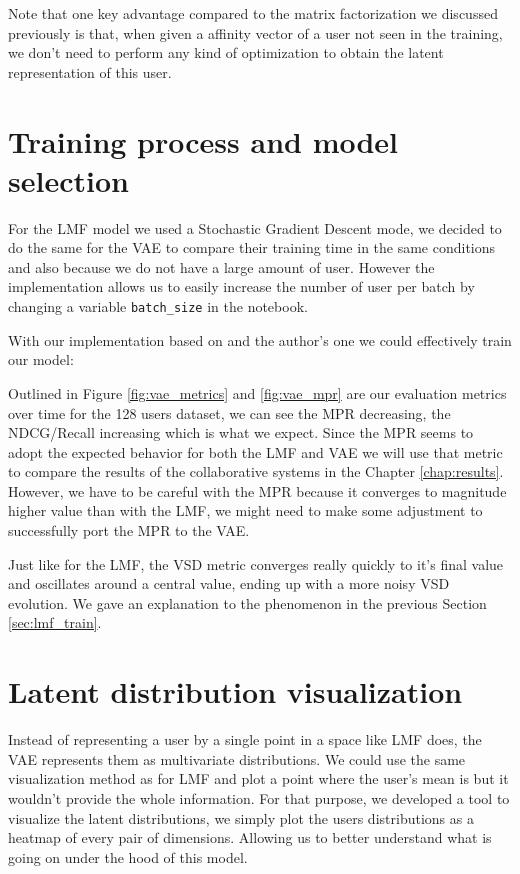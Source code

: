 Note that one key advantage compared to the matrix factorization we discussed previously is that, when given a affinity vector of a user not seen in the training, we don't need to perform any kind of optimization to obtain the latent representation of this user.

\section{Training process and model selection} \label{sec:vae_train}
For the LMF model we used a Stochastic Gradient Descent mode, we decided to do the same for the VAE to compare their training time in the same conditions and also because we do not have a large amount of user. However the implementation allows us to easily increase the number of user per batch by changing a variable \texttt{batch\_size} in the  notebook.

With our implementation based on \cite{vae-cf-pytorch} and the author's one \cite{vae-cf} we could effectively train our model:

Outlined in Figure \ref{fig:vae_metrics} and \ref{fig:vae_mpr} are our evaluation metrics over time for the 128 users dataset, we can see the MPR decreasing, the NDCG/Recall increasing which is what we expect. Since the MPR seems to adopt the expected behavior for both the LMF and VAE we will use that metric to compare the results of the collaborative systems in the Chapter \ref{chap:results}. However, we have to be careful with the MPR because it converges to magnitude higher value than with the LMF, we might need to make some adjustment to successfully port the MPR to the VAE.

\newpage

Just like for the LMF, the VSD metric converges really quickly to it's final value and oscillates around a central value, ending up with a more noisy VSD evolution. We gave an explanation to the phenomenon in the previous Section \ref{sec:lmf_train}.

\newpage

\section{Latent distribution visualization}
Instead of representing a user by a single point in a space like LMF does, the VAE represents them as multivariate distributions. We could use the same visualization method as for LMF and plot a point where the user's mean is but it wouldn't provide the whole information. For that purpose, we developed a tool to visualize the latent distributions, we simply plot the users distributions as a heatmap of every pair of dimensions. Allowing us to better understand what is going on under the hood of this model.

